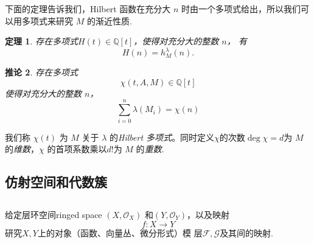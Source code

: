 \documentclass[11pt]{article}
\theoremstyle{plain}
\newtheorem{theorem}{定理}[section]
\newtheorem{corollary}[theorem]{推论}
\theoremstyle{definition}
\theoremstyle{remark}
\begin{document}
下面的定理告诉我们，Hilbert 函数在充分大 $n$ 时由一个多项式给出，所以我们可以用多项式来研究 $M$ 的渐近性质.
\begin{theorem}
    存在多项式$H(t)\in\mathbb{Q}[t]$，使得对充分大的整数 $n$，
    有
    \[
        H(n)=h_M^\lambda(n).
    \]
\end{theorem}

\begin{corollary}
    存在多项式
    \[
        \chi(t,A,M)\in\mathbb{Q}[t]
    \]
    使得对充分大的整数 $n$，
    \[
        \sum_{i=0}^{n}
        \lambda(M_i)
        =
        \chi(n)
    \]
\end{corollary}
我们称 $\chi(t)$ 为 $M$ 关于 $\lambda$ 的\emph{Hilbert 多项式}。同时定义$\chi$的次数$\deg \chi=d$为 $M$ 的\emph{维数}，$\chi$ 的首项系数乘以$d!$为 $M$ 的\emph{重数}.



\subsection{仿射空间和代数簇}

\subsection{}

给定层环空间ringed space $\left(X,\mathcal{O}_X\right)$ 和$\left(Y,\mathcal{O}_Y\right)$，以及映射
\begin{equation}
    f:X\to Y
\end{equation}
研究$X,Y$上的对象（函数、向量丛、微分形式）模   层$\mathcal{F},\mathcal{G}$及其间的映射.
\end{document}
